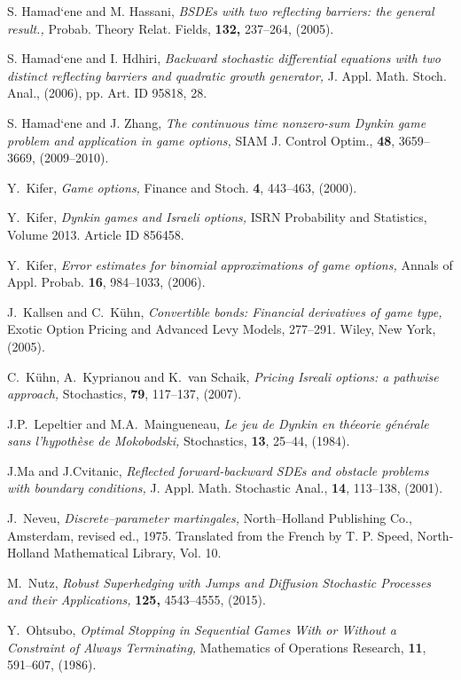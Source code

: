 \documentclass{amsart}
\numberwithin{equation}{section}
\begin{document}
\begin{thebibliography}{99}
S. Hamad`ene and M. Hassani,
{\em BSDEs with two reflecting barriers: the general result.,}
 Probab. Theory Relat. Fields,
{\bf 132,} 237--264, (2005).


S. Hamad`ene and I. Hdhiri,
{\em  Backward stochastic differential equations with two distinct reflecting barriers and quadratic
growth generator,} J. Appl. Math. Stoch. Anal., (2006), pp. Art. ID 95818, 28.


S. Hamad`ene and J. Zhang,
{\em The continuous time nonzero-sum Dynkin game problem and application in game options,}
SIAM J. Control Optim., {\bf 48}, 3659--3669, (2009--2010).

 Y.~Kifer, {\em Game options,} Finance and Stoch. {\bf 4},
443--463, (2000).


 Y.~Kifer,
{\em Dynkin games and Israeli options,}
 ISRN Probability and Statistics, Volume 2013. Article ID 856458.

 Y.~Kifer,
{\em Error estimates for binomial approximations of game options,}
Annals of Appl. Probab. {\bf 16}, 984--1033, (2006).


J.~Kallsen and C.~K\"{u}hn,
{\em  Convertible bonds: Financial derivatives of game type,}
Exotic Option Pricing and Advanced Levy Models, 277--291. Wiley, New York, (2005).

C.~K\"{u}hn, A.~Kyprianou and K.~van Schaik,
{\em Pricing Isreali options: a pathwise approach,}
Stochastics, {\bf 79}, 117--137, (2007).


J.P.~Lepeltier and M.A.~Maingueneau,
{\em Le jeu de Dynkin en th\'{e}eorie g\'{e}n\'{e}rale sans l'hypoth\`{e}se de Mokobodski,}
Stochastics, {\bf 13}, 25--44, (1984).

J.Ma and J.Cvitanic,
{\em Reflected forward-backward SDEs and obstacle problems with boundary conditions,} J. Appl.
Math. Stochastic Anal., {\bf 14}, 113--138, (2001).

J.~Neveu,
{\em Discrete--parameter martingales,}
 North--Holland Publishing Co., Amsterdam, revised ed., 1975. Translated
from the French by T. P. Speed, North-Holland Mathematical Library, Vol. 10.

M.~Nutz,
{\em Robust Superhedging with Jumps and Diffusion
Stochastic Processes and their Applications,}
{\bf 125,}  4543--4555, (2015).


Y.~Ohtsubo,
{\em Optimal Stopping in Sequential Games With or Without a Constraint of Always Terminating,}
Mathematics of Operations Research, {\bf 11}, 591--607, (1986).


\end{thebibliography}
\end{document}
